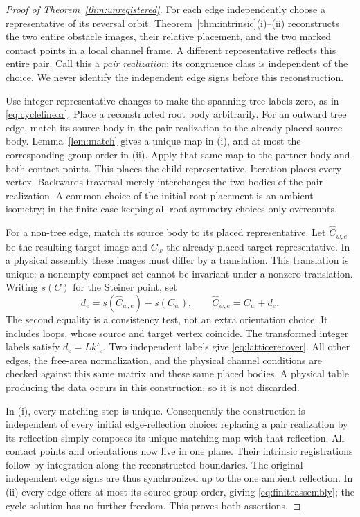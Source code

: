 \begin{proof}[Proof of Theorem~\ref{thm:unregistered}]
For each edge independently choose a representative of its reversal
orbit. Theorem~\ref{thm:intrinsic}(i)--(ii) reconstructs the two entire
obstacle images, their relative placement, and the two marked contact
points in a local channel frame. A different representative reflects
this entire pair. Call this a \emph{pair realization}; its congruence
class is independent of the choice. We never identify the independent
edge signs before this reconstruction.

Use integer representative changes to make the spanning-tree labels zero,
as in \eqref{eq:cyclelinear}. Place a reconstructed root body arbitrarily.
For an outward tree edge, match its source body in the pair realization
to the already placed source body. Lemma~\ref{lem:match} gives a unique
map in (i), and at most the corresponding group order in (ii). Apply
that same map to the partner body and both contact points. This places
the child representative. Iteration places every vertex. Backwards
traversal merely interchanges the two bodies of the pair realization.
A common choice of the initial root placement is an ambient isometry;
in the finite case keeping all root-symmetry choices only overcounts.

For a non-tree edge, match its source body to its placed representative.
Let $\widehat C_{w,e}$ be the resulting target image and $C_w$ the
already placed target representative. In a physical assembly these
images must differ by a translation. This translation is unique:
a nonempty compact set cannot be invariant under a nonzero translation.
Writing $s(C)$ for the Steiner point, set
\begin{equation}\label{eq:unregisteredcycle}
 d_e=s(\widehat C_{w,e})-s(C_w),\qquad
 \widehat C_{w,e}=C_w+d_e.
\end{equation}
The second equality is a consistency test, not an extra orientation
choice. It includes loops, whose source and target vertex coincide.
The transformed integer labels satisfy $d_e=Lk'_e$. Two independent
labels give \eqref{eq:latticerecover}. All other edges, the free-area
normalization, and the physical channel conditions are checked against
this same matrix and these same placed bodies. A physical table producing
the data occurs in this construction, so it is not discarded.

In (i), every matching step is unique. Consequently the construction is
independent of every initial edge-reflection choice: replacing a pair
realization by its reflection simply composes its unique matching map
with that reflection. All contact points and orientations now live in one
plane. Their intrinsic registrations follow by integration along the
reconstructed boundaries. The original independent edge signs are thus
synchronized up to the one ambient reflection. In (ii) every edge offers
at most its source group order, giving \eqref{eq:finiteassembly}; the
cycle solution has no further freedom. This proves both assertions.
\end{proof}

